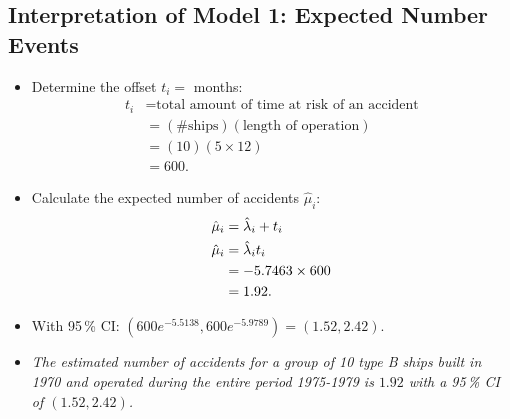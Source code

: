 \documentclass{article}\usepackage[]{graphicx}\usepackage[svgnames]{xcolor}
\makeatletter
\newcommand{\hlnum}[1]{\textcolor[rgb]{0.686,0.059,0.569}{#1}}%
\newcommand{\hlopt}[1]{\textcolor[rgb]{0,0,0}{#1}}%
\newcommand{\hlstd}[1]{\textcolor[rgb]{0.345,0.345,0.345}{#1}}%
\newcommand{\hlkwd}[1]{\textcolor[rgb]{0.737,0.353,0.396}{\textbf{#1}}}%
\newenvironment{kframe}{%
 \def\at@end@of@kframe{}%
 \ifinner\ifhmode%
  \def\at@end@of@kframe{\end{minipage}}%
  \begin{minipage}{\columnwidth}%
 \fi\fi%
 \def\FrameCommand##1{\hskip\@totalleftmargin \hskip-\fboxsep
 \colorbox{shadecolor}{##1}\hskip-\fboxsep
     \hskip-\linewidth \hskip-\@totalleftmargin \hskip\columnwidth}%
 \MakeFramed {\advance\hsize-\width
   \@totalleftmargin\z@ \linewidth\hsize
   \@setminipage}}%
 {\par\unskip\endMakeFramed%
 \at@end@of@kframe}
\newenvironment{knitrout}{}{} %
\let\exp\relax%
\let\log\relax%
\makeatother
\begin{document}
\subsection*{Interpretation of Model 1: Expected Number Events}
\begin{itemize}
    \item Determine the offset $ t_i= $ months:
          \begin{align*}
              t_i
               & =\text{total amount of time at risk of an accident} \\
               & =(\text{\# ships})(\text{length of operation})      \\
               & =(10)(5\times 12)                                   \\
               & =600.
          \end{align*}
    \item Calculate the expected number of accidents $ \hat{\mu}_i $:
          \begin{align*}
              \log{\hat{\mu}_i}
                          & =\log{\hat{\lambda}_i}+\log{t_i} \\
              \hat{\mu}_i & =\hat{\lambda}_i t_i             \\
                          & =\exp{-5.7463}\times 600         \\
                          & =1.92.
          \end{align*}
    \item With 95\,\% CI: $ (600 e^{-5.5138},600 e^{-5.9789})=(1.52,2.42) $.
    \item \emph{The estimated number of accidents for a group of 10 type B ships built in 1970
              and operated during the entire period 1975-1979 is $1.92$ with a 95\,\% CI of $(1.52,2.42)$.}
\end{itemize}
\end{document}
